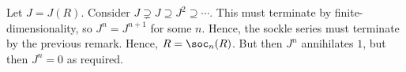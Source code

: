 Let $J = J(R)$. Consider
$J \supsetneq J \supseteq J^2 \supseteq \cdots$. This must terminate by
finite-dimensionality, so  $J^n = J^{n+1}$ for some $n$. Hence, the sockle
series must terminate by the previous remark. Hence, $R = \soc_n(R)$. But then
$J^n$ annihilates $1$, but then $J^n = 0$ as required.
